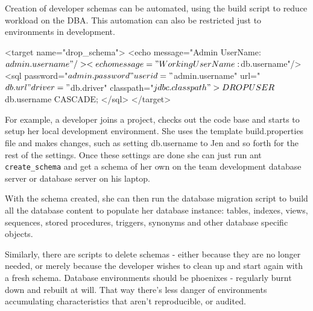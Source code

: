 \documentclass[12pt]{article}
\begin{document}

Creation of developer schemas can be automated, using the build script
to reduce workload on the DBA. This automation can also be restricted
just to environments in development.

\begin{xmlcode}
<target name="drop_schema">
    <echo message="Admin UserName: ${admin.username}"/>
    <echo message="Working UserName: ${db.username}"/>
    <sql password="${admin.password}" userid="${admin.username}"
         url="${db.url}" driver="${db.driver}" classpath="${jdbc.classpath}"
         >
        DROP USER ${db.username} CASCADE;
    </sql>
</target>
\end{xmlcode}

For example, a developer joins a project, checks out the code base and
starts to setup her local development environment. She uses the template
build.properties file and makes changes, such as setting db.username to
Jen and so forth for the rest of the settings. Once these settings are
done she can just run ant \verb=create_schema= and get a schema of her own on
the team development database server or database server on his laptop.

With the schema created, she can then run the database migration script
to build all the database content to populate her database instance:
tables, indexes, views, sequences, stored procedures, triggers, synonyms
and other database specific objects.

Similarly, there are scripts to delete schemas - either because they are
no longer needed, or merely because the developer wishes to clean up and
start again with a fresh schema. Database environments should be
phoenixes - regularly burnt down and rebuilt at will. That way there's
less danger of environments accumulating characteristics that aren't
reproducible, or audited.
\end{document}
